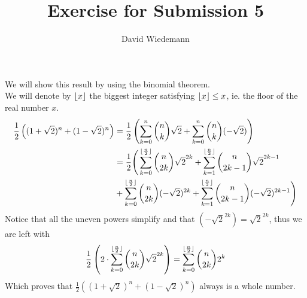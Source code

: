 \documentclass[11pt, a4paper, twoside]{article}
\DeclarePairedDelimiter\floor{\lfloor}{\rfloor}
\begin{document}
\title{Exercise for Submission 5}
\author{David Wiedemann}
\maketitle
We will show this result by using the binomial theorem.\\
We will denote by $\floor x$  the biggest integer satisfying $\floor x \leq x$, ie. the floor of the real number $x.$
\begin{align*}
	\frac{1}{2} \left( ( 1+ \sqrt{2} )^{n} + ( 1- \sqrt{2} ) ^{n}	  \right) &= \frac{1}{2} \left( \sum_{k=0}^{n } \binom n k \sqrt{2} + \sum_{k=0}^{ n} \binom n k ( - \sqrt{2} )  \right)\\
		 &= \frac{1}{2} \Bigg( \sum_{k=0}^{ \floor { \frac{n}{2} }} \binom { n} { 2k} \sqrt{2}^{2k} + \sum_{k=1}^{ \floor { \frac{n}{2} }} \binom { n} { 2k-1} \sqrt{2}^{2k-1}\\
		 &+\sum_{k=0}^{ \floor { \frac{n}{2} }} \binom { n} { 2k}( - \sqrt{2} )^{2k} + \sum_{k=1}^{ \floor { \frac{n}{2} }} \binom { n} { 2k-1} (- \sqrt{2} )^{2k-1}   \Bigg) 
\end{align*}
Notice that all the uneven powers simplify and that $( - \sqrt{2} ^{2k}) = \sqrt{2} ^{2k}$, thus we are left with
\begin{align*}
	\frac{1}{2} \left( 2 \cdot\sum_{k=0}^{ \floor { \frac{n}{2} }} \binom { n} { 2k} \sqrt{2}^{2k} \right) &= \sum_{k=0}^{ \floor { \frac{n }{2}} } \binom n { 2k} 2 ^{k}	 \\
\end{align*}
Which proves that  $ \frac{1}{2} (  ( 1+ \sqrt{2} )^{n} + ( 1- \sqrt{2} )^{n}) $ always is a whole number.
\end{document}
